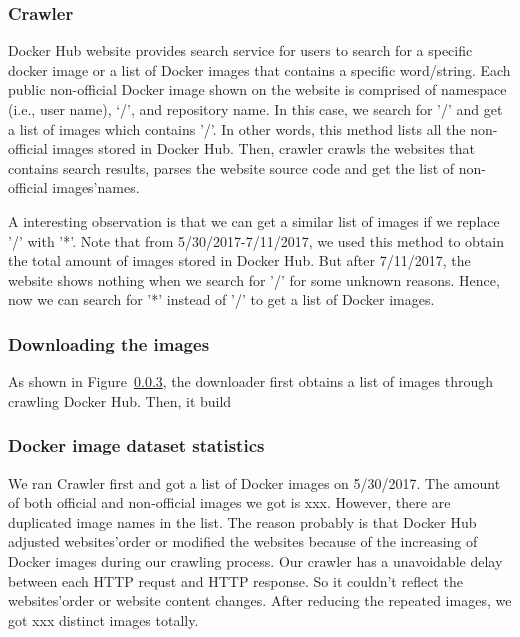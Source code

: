\subsubsection{Crawler}

Docker Hub website provides search service for users to search for a specific docker image or a list of Docker images that contains a specific word/string. Each public non-official Docker image shown on the website is comprised of namespace (i.e., user name), `/', and repository name. In this case, we search for '/' and get a list of images which contains '/'. In other words, this method lists all the non-official images stored in Docker Hub. Then, crawler crawls the websites that contains search results, parses the website source code and get the list of non-official images'names. 

A interesting observation is that we can get a similar list of images if we replace '/' with '*'. Note that from 5/30/2017-7/11/2017, we used this method to obtain the total amount of images stored in Docker Hub. But after 7/11/2017, the website shows nothing when we search for '/' for some unknown reasons. Hence, now we can search for '*' instead of '/' to get a list of Docker images.


\subsubsection{Downloading the images}

As shown in Figure~\ref{}, the downloader first obtains a list of images through crawling Docker Hub. Then, it build

\subsubsection{Docker image dataset statistics}

We ran Crawler first and got a list of Docker images on 5/30/2017. The amount of both official and non-official images we got is xxx. However, there are duplicated image names in the list. The reason probably is that Docker Hub adjusted websites'order or modified the websites because of the increasing of Docker images during our crawling process. Our crawler has a unavoidable delay between each HTTP requst and HTTP response. So it couldn't reflect the websites'order or website content changes. After reducing the repeated images, we got xxx distinct images totally. 


